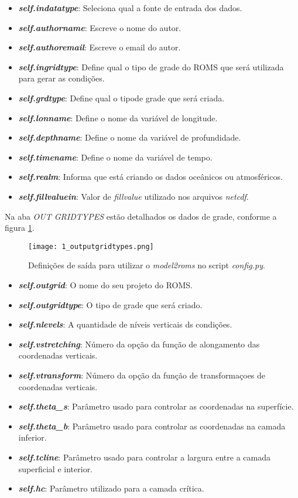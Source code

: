 \begin{itemize}
\item \textbf{\textit{self.indatatype}}: Seleciona qual a fonte de entrada dos dados.
\item \textbf{\textit{self.authorname}}: Escreve o nome do autor.
\item \textbf{\textit{self.authoremail}}: Escreve o email do autor.
\item \textbf{\textit{self.ingridtype}}: Define qual o tipo de grade do ROMS que será utilizada para gerar as condições.
\item \textbf{\textit{self.grdtype}}: Define qual o tipode grade que será criada.
\item \textbf{\textit{self.lonname}}: Define o nome da variável de longitude.
\item \textbf{\textit{self.depthname}}: Define o nome da variável de profundidade.
\item \textbf{\textit{self.timename}}: Define o nome da variável de tempo.
\item \textbf{\textit{self.realm}}: Informa que está criando os dados oceânicos ou atmosféricos.
\item \textbf{\textit{self.fillvaluein}}: Valor de \textit{fillvalue} utilizado nos arquivos \textit{netcdf}.
\end{itemize}
\bigskip

\noindent Na aba \textit{OUT GRIDTYPES} estão detalhados os dados de grade, conforme a figura \textcolor{bleu_cite}{\ref{outmodel2roms}}.
\bigskip

\begin{figure}[H]
    \centering
    \captionsetup{justification=centering}
    \texttt{[image: 1\_outputgridtypes.png]}
    \caption{Definições de saída para utilizar o \textit{model2roms} no script \textit{config.py}.}
    \label{outmodel2roms}
\end{figure}
\bigskip

\begin{itemize}
\item \textbf{\textit{self.outgrid}}: O nome do seu projeto do ROMS.
\item \textbf{\textit{self.outgridtype}}: O tipo de grade que será criado.
\item \textbf{\textit{self.nlevels}}: A quantidade de níveis verticais ds condições.
\item \textbf{\textit{self.vstretching}}: Número da opção da função de alongamento das coordenadas verticais.
\item \textbf{\textit{self.vtransform}}: Número da opção da função de transformaçoes de coordenadas verticais.
\item \textbf{\textit{self.theta\_s}}: Parâmetro usado para controlar as coordenadas na superfície.
\item \textbf{\textit{self.theta\_b}}: Parâmetro usado para controlar as coordenadas na camada inferior.
\item \textbf{\textit{self.tcline}}: Parâmetro usado para controlar a largura entre a camada superficial e interior.
\item \textbf{\textit{self.hc}}: Parâmetro utilizado para a camada crítica.
\end{itemize}
\bigskip

